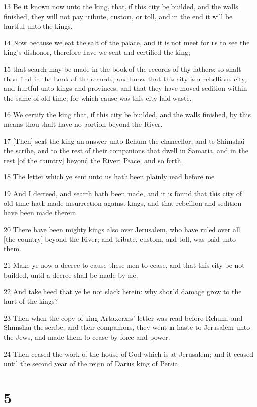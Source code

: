 \par 13 Be it known now unto the king, that, if this city be builded, and the walls finished, they will not pay tribute, custom, or toll, and in the end it will be hurtful unto the kings.
\par 14 Now because we eat the salt of the palace, and it is not meet for us to see the king's dishonor, therefore have we sent and certified the king;
\par 15 that search may be made in the book of the records of thy fathers: so shalt thou find in the book of the records, and know that this city is a rebellious city, and hurtful unto kings and provinces, and that they have moved sedition within the same of old time; for which cause was this city laid waste.
\par 16 We certify the king that, if this city be builded, and the walls finished, by this means thou shalt have no portion beyond the River.
\par 17 [Then] sent the king an answer unto Rehum the chancellor, and to Shimshai the scribe, and to the rest of their companions that dwell in Samaria, and in the rest [of the country] beyond the River: Peace, and so forth.
\par 18 The letter which ye sent unto us hath been plainly read before me.
\par 19 And I decreed, and search hath been made, and it is found that this city of old time hath made insurrection against kings, and that rebellion and sedition have been made therein.
\par 20 There have been mighty kings also over Jerusalem, who have ruled over all [the country] beyond the River; and tribute, custom, and toll, was paid unto them.
\par 21 Make ye now a decree to cause these men to cease, and that this city be not builded, until a decree shall be made by me.
\par 22 And take heed that ye be not slack herein: why should damage grow to the hurt of the kings?
\par 23 Then when the copy of king Artaxerxes' letter was read before Rehum, and Shimshai the scribe, and their companions, they went in haste to Jerusalem unto the Jews, and made them to cease by force and power.
\par 24 Then ceased the work of the house of God which is at Jerusalem; and it ceased until the second year of the reign of Darius king of Persia.

\chapter{5}

